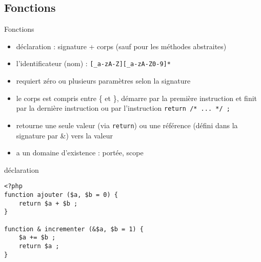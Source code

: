 \subsection{Fonctions}

\begin{frame}[containsverbatim]{Fonctions} %
\begin{itemize}
\item déclaration : signature + corps (sauf pour les méthodes abstraites)
\item l'identificateur (nom) : \texttt{[\_a-zA-Z][\_a-zA-Z0-9]*}
\item requiert zéro ou plusieurs paramètres selon la signature
\item le corps est compris entre \{ et \}, démarre par la première instruction et finit par la dernière instruction ou par l'instruction \lstinline!return /* ... */ ;!
\item retourne une seule valeur (via \texttt{return}) ou une référence (défini dans la signature par \&) vers la valeur
\item a un domaine d'existence : portée, scope
\end{itemize}
\begin{block}{déclaration}
\begin{lstlisting}
<?php
function ajouter ($a, $b = 0) {
	return $a + $b ;
}

function & incrementer (&$a, $b = 1) {
	$a += $b ;
	return $a ;
}
\end{lstlisting}
\end{block} 
\end{frame}

